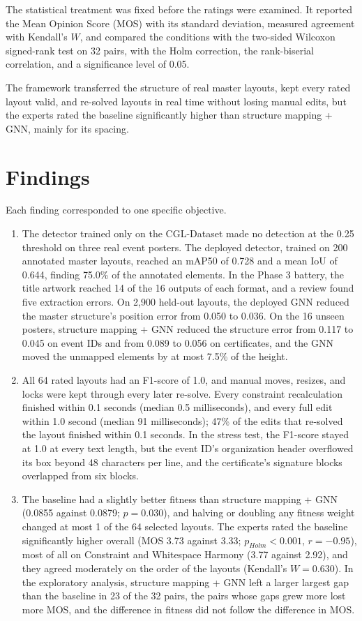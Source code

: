 \begin{refsection}
The statistical treatment was fixed before the ratings were examined. It reported the Mean Opinion Score (MOS) with its standard deviation, measured agreement with Kendall's $W$, and compared the conditions with the two-sided Wilcoxon signed-rank test on 32 pairs, with the Holm correction, the rank-biserial correlation, and a significance level of 0.05.

The framework transferred the structure of real master layouts, kept every rated layout valid, and re-solved layouts in real time without losing manual edits, but the experts rated the baseline significantly higher than structure mapping + GNN, mainly for its spacing.

\section{Findings}

Each finding corresponded to one specific objective.

\begin{enumerate}
    \item The detector trained only on the CGL-Dataset made no detection at the 0.25 threshold on three real event posters. The deployed detector, trained on 200 annotated master layouts, reached an mAP50 of 0.728 and a mean IoU of 0.644, finding 75.0\% of the annotated elements. In the Phase 3 battery, the title artwork reached 14 of the 16 outputs of each format, and a review found five extraction errors. On 2,900 held-out layouts, the deployed GNN reduced the master structure's position error from 0.050 to 0.036. On the 16 unseen posters, structure mapping + GNN reduced the structure error from 0.117 to 0.045 on event IDs and from 0.089 to 0.056 on certificates, and the GNN moved the unmapped elements by at most 7.5\% of the height.
    \item All 64 rated layouts had an F1-score of 1.0, and manual moves, resizes, and locks were kept through every later re-solve. Every constraint recalculation finished within 0.1 seconds (median 0.5 milliseconds), and every full edit within 1.0 second (median 91 milliseconds); 47\% of the edits that re-solved the layout finished within 0.1 seconds. In the stress test, the F1-score stayed at 1.0 at every text length, but the event ID's organization header overflowed its box beyond 48 characters per line, and the certificate's signature blocks overlapped from six blocks.
    \item The baseline had a slightly better fitness than structure mapping + GNN (0.0855 against 0.0879; $p = 0.030$), and halving or doubling any fitness weight changed at most 1 of the 64 selected layouts. The experts rated the baseline significantly higher overall (MOS 3.73 against 3.33; $p_{Holm} < 0.001$, $r = -0.95$), most of all on Constraint and Whitespace Harmony (3.77 against 2.92), and they agreed moderately on the order of the layouts (Kendall's $W = 0.630$). In the exploratory analysis, structure mapping + GNN left a larger largest gap than the baseline in 23 of the 32 pairs, the pairs whose gaps grew more lost more MOS, and the difference in fitness did not follow the difference in MOS.
\end{enumerate}


\end{refsection}
